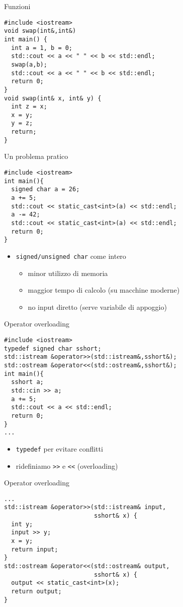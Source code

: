 \begin{frame}[fragile]{Funzioni}
  \vfill
  \begin{lstlisting}
#include <iostream>
void swap(int&,int&)
int main() {
  int a = 1, b = 0;
  std::cout << a << " " << b << std::endl;
  swap(a,b);
  std::cout << a << " " << b << std::endl;
  return 0;
}
void swap(int& x, int& y) {
  int z = x;
  x = y;
  y = z;
  return;
}
  \end{lstlisting}
  \vfill
\end{frame}

\begin{frame}[fragile]{Un problema pratico}
  \vfill
  \begin{lstlisting}
#include <iostream>
int main(){
  signed char a = 26;
  a += 5;
  std::cout << static_cast<int>(a) << std::endl;
  a -= 42;
  std::cout << static_cast<int>(a) << std::endl;
  return 0;
}
  \end{lstlisting}
  \vfill
  \begin{itemize}
    \item \lstinline$signed/unsigned char$ come intero
    \begin{itemize}
      \item minor utilizzo di memoria
      \item maggior tempo di calcolo (su macchine moderne)
      \item no input diretto (serve variabile di appoggio)
    \end{itemize}
  \end{itemize}
  \vfill
\end{frame}

\begin{frame}[fragile]{Operator overloading}
  \vfill
  \begin{lstlisting}
#include <iostream>
typedef signed char sshort;
std::istream &operator>>(std::istream&,sshort&);
std::ostream &operator<<(std::ostream&,sshort&);
int main(){
  sshort a;
  std::cin >> a;
  a += 5;
  std::cout << a << std::endl;
  return 0;
}
...\end{lstlisting}
  \vfill
  \begin{itemize}
    \item \lstinline$typedef$ per evitare conflitti
    \vfill
    \item ridefiniamo \lstinline$>>$ e \lstinline$<<$ (\alert{overloading})
  \end{itemize}
  \vfill
\end{frame}

\begin{frame}[fragile]{Operator overloading}
  \vfill
  \begin{lstlisting}[firstnumber=11]
...
std::istream &operator>>(std::istream& input,
                         sshort& x) {
  int y;
  input >> y;
  x = y;
  return input;
}
std::ostream &operator<<(std::ostream& output,
                         sshort& x) {
  output << static_cast<int>(x);
  return output;
}
  \end{lstlisting}
  \vfill
\end{frame}
